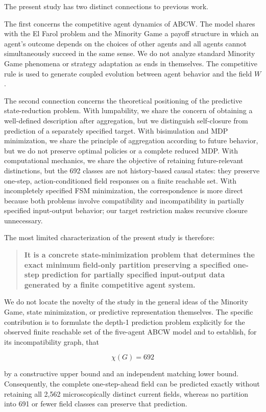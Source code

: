 \documentclass[
  11pt,
]{article}
\begin{document}
The present study has two distinct connections to previous work.

The first concerns the competitive agent dynamics of ABCW. The model
shares with the El Farol problem and the Minority Game a payoff
structure in which an agent's outcome depends on the choices of other
agents and all agents cannot simultaneously succeed in the same sense.
We do not analyze standard Minority Game phenomena or strategy
adaptation as ends in themselves. The competitive rule is used to
generate coupled evolution between agent behavior and the field \({W}\).

The second connection concerns the theoretical positioning of the
predictive state-reduction problem. With lumpability, we share the
concern of obtaining a well-defined description after aggregation, but
we distinguish self-closure from prediction of a separately specified
target. With bisimulation and MDP minimization, we share the principle
of aggregation according to future behavior, but we do not preserve
optimal policies or a complete reduced MDP. With computational
mechanics, we share the objective of retaining future-relevant
distinctions, but the 692 classes are not history-based causal states:
they preserve one-step, action-conditioned field responses on a finite
reachable set. With incompletely specified FSM minimization, the
correspondence is more direct because both problems involve
compatibility and incompatibility in partially specified input-output
behavior; our target restriction makes recursive closure unnecessary.

The most limited characterization of the present study is therefore:

\begin{quote}
\textbf{It is a concrete state-minimization problem that determines the
exact minimum field-only partition preserving a specified one-step
prediction for partially specified input-output data generated by a
finite competitive agent system.}
\end{quote}

We do not locate the novelty of the study in the general ideas of the
Minority Game, state minimization, or predictive representation
themselves. The specific contribution is to formulate the depth-1
prediction problem explicitly for the observed finite reachable set of
the five-agent ABCW model and to establish, for its incompatibility
graph, that

\[{\chi(G)=692}\]

by a constructive upper bound and an independent matching lower bound.
Consequently, the complete one-step-ahead field can be predicted exactly
without retaining all 2,562 microscopically distinct current fields,
whereas no partition into 691 or fewer field classes can preserve that
prediction.
\end{document}
